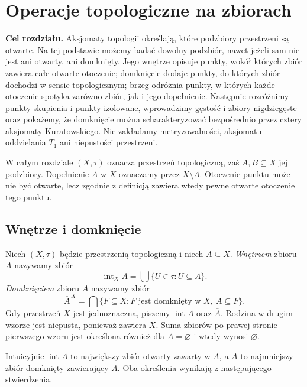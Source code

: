\chapter{Operacje topologiczne na zbiorach}
\label{ch:topog-operacje-zbiorowe}

\noindent\textbf{Cel rozdziału.}
Aksjomaty topologii określają, które podzbiory przestrzeni są otwarte.
Na tej podstawie możemy badać dowolny podzbiór, nawet jeżeli sam nie jest
ani otwarty, ani domknięty. Jego wnętrze opisuje punkty, wokół których
zbiór zawiera całe otwarte otoczenie; domknięcie dodaje punkty, do których
zbiór dochodzi w sensie topologicznym; brzeg odróżnia punkty, w których
każde otoczenie spotyka zarówno zbiór, jak i jego dopełnienie.
Następnie rozróżnimy punkty skupienia i punkty izolowane, wprowadzimy
gęstość i zbiory nigdziegęste oraz pokażemy, że domknięcie można
scharakteryzować bezpośrednio przez cztery aksjomaty Kuratowskiego.
Nie zakładamy metryzowalności, aksjomatu oddzielania $T_1$ ani
niepustości przestrzeni.

W całym rozdziale $(X,\tau)$ oznacza przestrzeń topologiczną, zaś
$A,B\subseteq X$ jej podzbiory. Dopełnienie $A$ w $X$ oznaczamy przez
$X\setminus A$. Otoczenie punktu może nie być otwarte, lecz zgodnie
z definicją zawiera wtedy pewne otwarte otoczenie tego punktu.

\section{Wnętrze i domknięcie}
\label{sec:topog-wnetrze-domkniecie}

\begin{definicja}
\label{def:topog-wnetrze-domkniecie}
Niech $(X,\tau)$ będzie przestrzenią topologiczną i niech $A\subseteq X$.
\emph{Wnętrzem} zbioru $A$ nazywamy zbiór
\[
\operatorname{int}_X A
 =\bigcup\{U\in\tau:U\subseteq A\}.
\]
\emph{Domknięciem} zbioru $A$ nazywamy zbiór
\[
\overline A^{\,X}
 =\bigcap\{F\subseteq X:F\text{ jest domknięty w }X,
                    \ A\subseteq F\}.
\]
Gdy przestrzeń $X$ jest jednoznaczna, piszemy $\operatorname{int}A$
oraz $\overline A$. Rodzina w drugim wzorze jest niepusta,
ponieważ zawiera $X$. Suma zbiorów po prawej stronie pierwszego wzoru
jest określona również dla $A=\varnothing$ i wtedy wynosi $\varnothing$.
\end{definicja}

Intuicyjnie $\operatorname{int}A$ to największy zbiór otwarty
zawarty w $A$, a $\overline A$ to najmniejszy zbiór domknięty
zawierający $A$. Oba określenia wynikają z następującego stwierdzenia.

